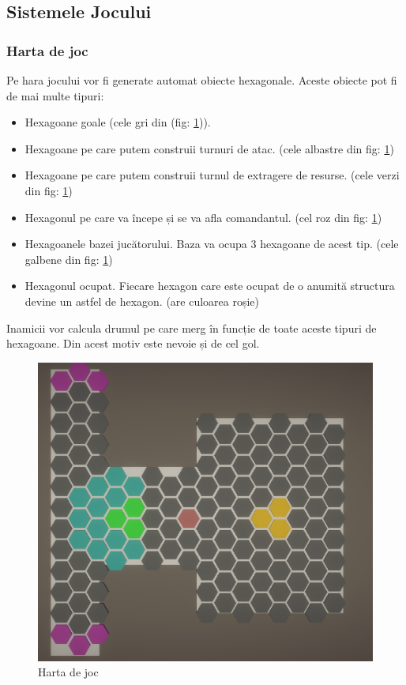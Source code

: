 \documentclass[12pt, a4paper]{article}
\begin{document}
	\subsection{Sistemele Jocului}
	
	
	
	
	
	\subsubsection{Harta de joc}
	
	Pe hara jocului vor fi generate automat obiecte hexagonale. Aceste obiecte pot fi de mai multe tipuri:
	\begin{itemize}
		\item Hexagoane goale (cele gri din (fig: \ref{fig: gridSystem})).
		\item Hexagoane pe care putem construii turnuri de atac. (cele albastre din fig: \ref{fig: gridSystem})
		\item Hexagoane pe care putem construii turnul de extragere de resurse. (cele verzi din fig: \ref{fig: gridSystem})
		\item Hexagonul pe care va începe și se va afla comandantul. (cel roz din fig: \ref{fig: gridSystem})
		\item Hexagoanele bazei jucătorului. Baza va ocupa 3 hexagoane de acest tip. (cele galbene din fig: \ref{fig: gridSystem})
		\item Hexagonul ocupat. Fiecare hexagon care este ocupat de o anumită structura devine un astfel de hexagon. (are culoarea roșie)
	\end{itemize}
	
	Inamicii vor calcula drumul pe care merg în funcție de toate aceste tipuri de hexagoane. Din acest motiv este nevoie și de cel gol.
	
	\begin{figure}[H]
		\centering
		\includegraphics[width=1\textwidth]{Map.png}
		\caption{Harta de joc}
		\label{fig: gridSystem}
	\end{figure}
\end{document}
